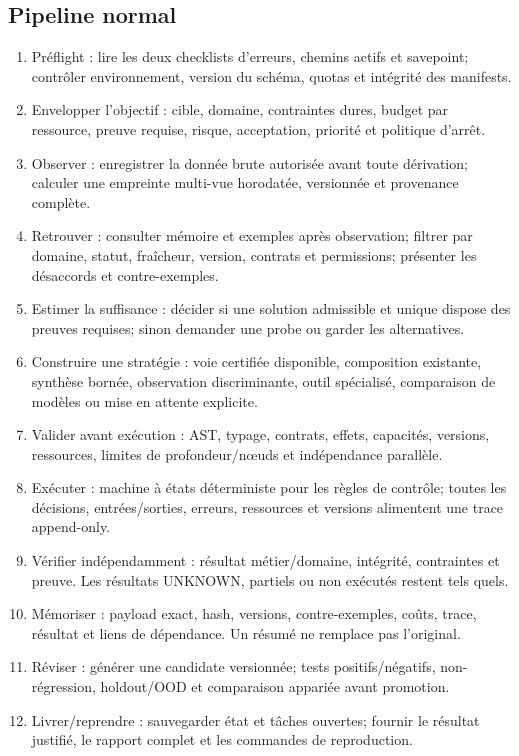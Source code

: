 \documentclass[10pt,a4paper]{article}
\begin{document}
\subsection{Pipeline normal}
\begin{enumerate}
\item Préflight : lire les deux checklists d'erreurs, chemins actifs et savepoint; contrôler environnement, version du schéma, quotas et intégrité des manifests.
\item Envelopper l'objectif : cible, domaine, contraintes dures, budget par ressource, preuve requise, risque, acceptation, priorité et politique d'arrêt.
\item Observer : enregistrer la donnée brute autorisée avant toute dérivation; calculer une empreinte multi-vue horodatée, versionnée et provenance complète.
\item Retrouver : consulter mémoire et exemples après observation; filtrer par domaine, statut, fraîcheur, version, contrats et permissions; présenter les désaccords et contre-exemples.
\item Estimer la suffisance : décider si une solution admissible et unique dispose des preuves requises; sinon demander une probe ou garder les alternatives.
\item Construire une stratégie : voie certifiée disponible, composition existante, synthèse bornée, observation discriminante, outil spécialisé, comparaison de modèles ou mise en attente explicite.
\item Valider avant exécution : AST, typage, contrats, effets, capacités, versions, ressources, limites de profondeur/nœuds et indépendance parallèle.
\item Exécuter : machine à états déterministe pour les règles de contrôle; toutes les décisions, entrées/sorties, erreurs, ressources et versions alimentent une trace append-only.
\item Vérifier indépendamment : résultat métier/domaine, intégrité, contraintes et preuve. Les résultats UNKNOWN, partiels ou non exécutés restent tels quels.
\item Mémoriser : payload exact, hash, versions, contre-exemples, coûts, trace, résultat et liens de dépendance. Un résumé ne remplace pas l'original.
\item Réviser : générer une candidate versionnée; tests positifs/négatifs, non-régression, holdout/OOD et comparaison appariée avant promotion.
\item Livrer/reprendre : sauvegarder état et tâches ouvertes; fournir le résultat justifié, le rapport complet et les commandes de reproduction.
\end{enumerate}
\end{document}
